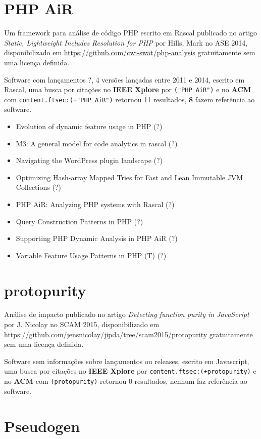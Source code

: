 \section{PHP AiR}

Um framework para análise de código PHP escrito em Rascal
publicado no artigo {\it Static, Lightweight Includes Resolution for PHP}
por Hills, Mark
no ASE 2014,
disponibilizado em \url{https://github.com/cwi-swat/php-analysis}
gratuitamente
sem uma licença definida.

Software com lançamentos ?,
4 versões lançadas
entre 2011 e 2014,
escrito em Rascal,
uma busca por citações no {\bf IEEE Xplore} por
\texttt{("PHP AiR")}
e no {\bf ACM} com
\texttt{content.ftsec:(+"PHP AiR")}
retornou
11 resultados,
{\bf 8} fazem referência ao software.

\begin{itemize}
\item Evolution of dynamic feature usage in PHP (?)
\item M3: A general model for code analytics in rascal (?)
\item Navigating the WordPress plugin landscape (?)
\item Optimizing Hash-array Mapped Tries for Fast and Lean Immutable JVM Collections (?)
\item PHP AiR: Analyzing PHP systems with Rascal (?)
\item Query Construction Patterns in PHP (?)
\item Supporting PHP Dynamic Analysis in PHP AiR (?)
\item Variable Feature Usage Patterns in PHP (T) (?)
\end{itemize}

\section{protopurity}

Análise de impacto
publicado no artigo {\it Detecting function purity in JavaScript}
por J. Nicolay
no SCAM 2015,
disponibilizado em \url{https://github.com/jensnicolay/jipda/tree/scam2015/protopurity}
gratuitamente
sem uma licença definida.

Software sem informações sobre lançamentos ou releases,
escrito em Javascript,
uma busca por citações no {\bf IEEE Xplore} por
\texttt{content.ftsec:(+protopurity)}
e no {\bf ACM} com
\texttt{(protopurity)}
retornou
0 resultados,
nenhum faz referência ao software.


\section{Pseudogen}


